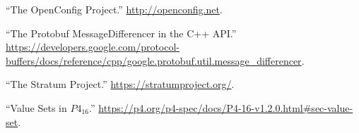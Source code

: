 \documentclass[11pt]{article}
\begin{document}
{{\begin{thebibliography}{37}
\mdbibitemlabel{{}[34]}\textquotedblleft{}The OpenConfig Project.\textquotedblright{} \href{http://openconfig.net}{{\ttfamily http://\hspace{0pt}openconfig.\hspace{0pt}net}}.\label{openconfig}%

\mdbibitemlabel{{}[35]}\textquotedblleft{}The Protobuf MessageDifferencer in the C++ API.\textquotedblright{} \href{https://developers.google.com/protocol-buffers/docs/reference/cpp/google.protobuf.util.message_differencer}{{\ttfamily https://\hspace{0pt}developers.\hspace{0pt}google.\hspace{0pt}com/\hspace{0pt}protocol-\hspace{0pt}buffers/\hspace{0pt}docs/\hspace{0pt}reference/\hspace{0pt}cpp/\hspace{0pt}google.\hspace{0pt}protobuf.\hspace{0pt}util.\hspace{0pt}message\_\hspace{0pt}differencer}}.\label{protomessagedifferencer}%

\mdbibitemlabel{{}[36]}\textquotedblleft{}The Stratum Project.\textquotedblright{} \href{https://stratumproject.org/}{{\ttfamily https://\hspace{0pt}stratumproject.\hspace{0pt}org/\hspace{0pt}}}.\label{stratum}%

\mdbibitemlabel{{}[37]}\textquotedblleft{}Value Sets in $P4_{16}$.\textquotedblright{} \href{https://p4.org/p4-spec/docs/P4-16-v1.2.0.html\%23sec-value-set}{{\ttfamily https://\hspace{0pt}p4.\hspace{0pt}org/\hspace{0pt}p4-\hspace{0pt}spec/\hspace{0pt}docs/\hspace{0pt}P4-\hspace{0pt}16-\hspace{0pt}v1.\hspace{0pt}2.\hspace{0pt}0.\hspace{0pt}html\#\hspace{0pt}sec-\hspace{0pt}value-\hspace{0pt}set}}.\label{p4valuesets}%
\par%
\end{thebibliography}}%
}%
\end{document}

